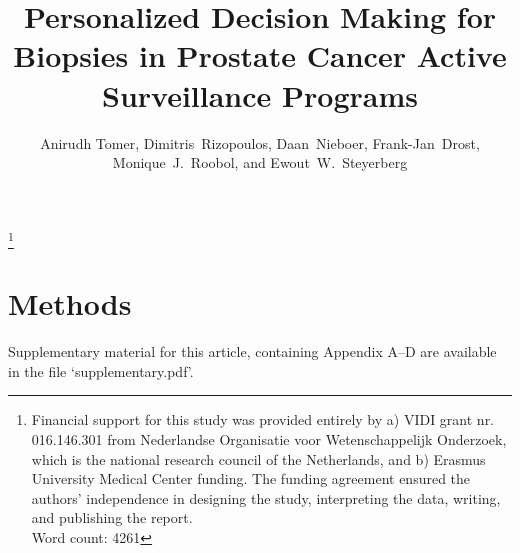 \documentclass[Review,sagev,times]{sagej}
\begin{document}

\title{Personalized Decision Making for Biopsies in Prostate Cancer Active Surveillance Programs}

\author{Anirudh Tomer, Dimitris~Rizopoulos, Daan~Nieboer, Frank-Jan~Drost, Monique~J.~Roobol, and Ewout~W.~Steyerberg}







\maketitle

\footnote{Financial support for this study was provided entirely by a) VIDI grant nr. 016.146.301 from Nederlandse Organisatie voor Wetenschappelijk Onderzoek, which is the national research council of the Netherlands, and b) Erasmus University Medical Center funding. The funding agreement ensured the authors’ independence in designing the study, interpreting the data, writing, and publishing the report.\\Word count: 4261}
\thefootnote



\section{Methods}
\label{sec:methods}











\begin{sm}
Supplementary material for this article, containing Appendix A--D are available in the file `supplementary.pdf'.
\end{sm} 



\end{document}
